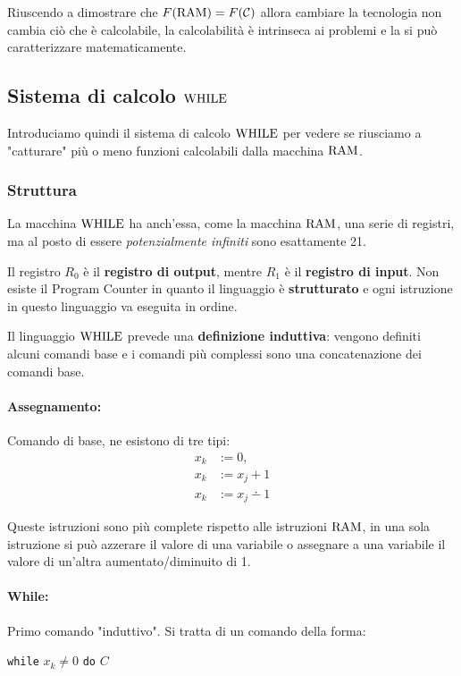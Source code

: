 Riuscendo a dimostrare che $F(\text{RAM}) = F(\mathcal{C})$ allora cambiare la tecnologia non cambia ciò che è calcolabile, la calcolabilità è intrinseca ai problemi e la si può caratterizzare matematicamente.

\subsection{Sistema di calcolo $\text{WHILE}$}

Introduciamo quindi il sistema di calcolo $\text{WHILE}$ per vedere se riusciamo a "catturare" più o meno funzioni calcolabili dalla macchina $\text{RAM}$.

\subsubsection{Struttura}

La macchina $\text{WHILE}$ ha anch'essa, come la macchina $\text{RAM}$, una serie di registri, ma al posto di essere \textit{potenzialmente infiniti} sono esattamente 21. 

Il registro $R_0$ è il \textbf{registro di output}, mentre $R_1$ è il \textbf{registro di input}. Non esiste il Program Counter in quanto il linguaggio è \textbf{strutturato} e ogni istruzione in questo linguaggio va eseguita in ordine.

Il linguaggio $\text{WHILE}$ prevede una \textbf{definizione induttiva}: vengono definiti alcuni comandi base e i comandi più complessi sono una concatenazione dei comandi base.

\paragraph{Assegnamento:} Comando di base, ne esistono di tre tipi:
\begin{align*}
	x_k & := 0, \\
	x_k & := x_j + 1 \\
	x_k & := x_j \dotminus 1
\end{align*}

Queste istruzioni sono più complete rispetto alle istruzioni $\text{RAM}$, in una sola istruzione si può azzerare il valore di una variabile o assegnare a una variabile il valore di un'altra aumentato/diminuito di 1.

\paragraph{While:} Primo comando "induttivo". Si tratta di un comando della forma: 
\begin{center}
	\texttt{while} $x_k \neq 0$ \texttt{do} $C$
\end{center}


